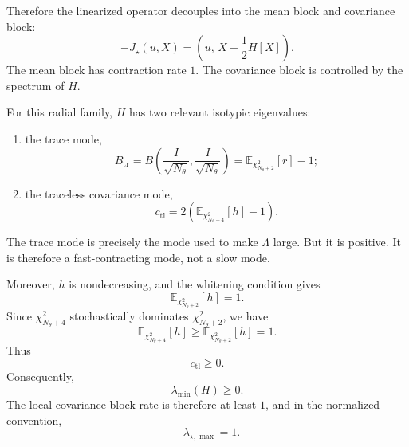 \documentclass[11pt]{article}
\numberwithin{equation}{section}
\begin{document}
Therefore the linearized operator decouples into the mean block and covariance block:
\begin{equation}
    -J_\star(u,X)
    =
    \left(
    u,
    \,
    X+\frac12 H[X]
    \right).
\end{equation}
The mean block has contraction rate $1$. 
The covariance block is controlled by the spectrum of $H$.

For this radial family, $H$ has two relevant isotypic eigenvalues:
\begin{enumerate}[label=(\roman*)]
    \item the trace mode,
    \begin{equation}
        B_{\mathrm{tr}}
        =
        B\left(\frac{I}{\sqrt{N_\theta}},\frac{I}{\sqrt{N_\theta}}\right)
        =
        \mathbb E_{\chi_{N_\theta+2}^2}[r]-1;
    \end{equation}
    \item the traceless covariance mode,
    \begin{equation}
        c_{\mathrm{tl}}
        =
        2
        \left(
        \mathbb E_{\chi_{N_\theta+4}^2}[h]-1
        \right).
    \end{equation}
\end{enumerate}

The trace mode is precisely the mode used to make $\Lambda$ large. 
But it is positive. 
It is therefore a fast-contracting mode, not a slow mode.

Moreover, $h$ is nondecreasing, and the whitening condition gives
\begin{equation}
    \mathbb E_{\chi_{N_\theta+2}^2}[h]=1.
\end{equation}
Since $\chi_{N_\theta+4}^2$ stochastically dominates $\chi_{N_\theta+2}^2$, we have
\begin{equation}
    \mathbb E_{\chi_{N_\theta+4}^2}[h]
    \ge
    \mathbb E_{\chi_{N_\theta+2}^2}[h]
    =
    1.
\end{equation}
Thus
\begin{equation}
    c_{\mathrm{tl}}\ge 0.
\end{equation}
Consequently,
\begin{equation}
    \lambda_{\min}(H)\ge 0.
\end{equation}
The local covariance-block rate is therefore at least $1$, and in the normalized convention,
\begin{equation}
    -\lambda_{\star,\max}
    =
    1.
\end{equation}
\end{document}
